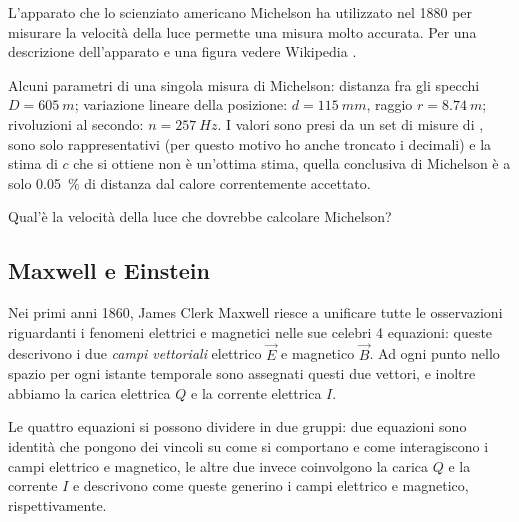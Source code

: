 \documentclass[a4paper,12pt]{article}
\begin{document}
\begin{exo}


L'apparato che lo scienziato americano Michelson ha utilizzato nel 1880 \cite[]{michelsonExperimentalDeterminationVelocity1880} per misurare la velocità della luce permette una misura molto accurata.
Per una descrizione dell'apparato e una figura vedere Wikipedia \cite[figura 3]{wikipediacontributorsFizeauFoucaultApparatus2019}.

Alcuni parametri di una singola misura di Michelson: distanza fra gli specchi \(D = \SI{605}{m}\); variazione lineare della posizione: \(d = \SI{115}{mm}\), raggio \(r = \SI{8.74}{m}\); rivoluzioni al secondo: \(n = \SI{257}{Hz}\). I valori sono presi da un set di misure di \textcite[]{michelsonExperimentalDeterminationVelocity1880}, sono solo rappresentativi (per questo motivo ho anche troncato i decimali) e la stima di \(c\) che si ottiene non è un'ottima stima, quella conclusiva di Michelson è a solo \SI{.05}{\percent} di distanza dal calore correntemente accettato.

Qual'è la velocità della luce che dovrebbe calcolare Michelson?

\end{exo}

\subsection{Maxwell e Einstein}

Nei primi anni 1860, James Clerk Maxwell riesce a unificare tutte le osservazioni riguardanti i fenomeni elettrici e magnetici nelle sue celebri 4 equazioni: queste descrivono i due \emph{campi vettoriali} elettrico \(\vec{E}\) e magnetico \(\vec{B}\). 
Ad ogni punto nello spazio per ogni istante temporale sono assegnati questi due vettori, e inoltre abbiamo la carica elettrica \(Q\) e la corrente elettrica \(I\). 

Le quattro equazioni si possono dividere in due gruppi: due equazioni sono identità che pongono dei vincoli su come si comportano e come interagiscono i campi elettrico e magnetico, le altre due invece coinvolgono la carica \(Q\) e la corrente \(I\) e descrivono come queste generino i campi elettrico e magnetico, rispettivamente. 
\end{document}
